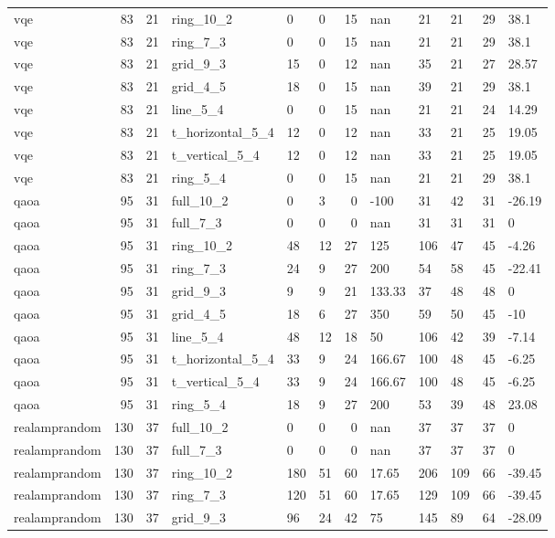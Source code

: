 \begin{longtable}{lrrlllrlllrl}
vqe & 83 & 21 & ring\_10\_2 & 0 & 0 & 15 & nan & 21 & 21 & 29 & 38.1 \\
vqe & 83 & 21 & ring\_7\_3 & 0 & 0 & 15 & nan & 21 & 21 & 29 & 38.1 \\
vqe & 83 & 21 & grid\_9\_3 & 15 & 0 & 12 & nan & 35 & 21 & 27 & 28.57 \\
vqe & 83 & 21 & grid\_4\_5 & 18 & 0 & 15 & nan & 39 & 21 & 29 & 38.1 \\
vqe & 83 & 21 & line\_5\_4 & 0 & 0 & 15 & nan & 21 & 21 & 24 & 14.29 \\
vqe & 83 & 21 & t\_horizontal\_5\_4 & 12 & 0 & 12 & nan & 33 & 21 & 25 & 19.05 \\
vqe & 83 & 21 & t\_vertical\_5\_4 & 12 & 0 & 12 & nan & 33 & 21 & 25 & 19.05 \\
vqe & 83 & 21 & ring\_5\_4 & 0 & 0 & 15 & nan & 21 & 21 & 29 & 38.1 \\
qaoa & 95 & 31 & full\_10\_2 & 0 & 3 & 0 & -100 & 31 & 42 & 31 & -26.19 \\
qaoa & 95 & 31 & full\_7\_3 & 0 & 0 & 0 & nan & 31 & 31 & 31 & 0 \\
qaoa & 95 & 31 & ring\_10\_2 & 48 & 12 & 27 & 125 & 106 & 47 & 45 & -4.26 \\
qaoa & 95 & 31 & ring\_7\_3 & 24 & 9 & 27 & 200 & 54 & 58 & 45 & -22.41 \\
qaoa & 95 & 31 & grid\_9\_3 & 9 & 9 & 21 & 133.33 & 37 & 48 & 48 & 0 \\
qaoa & 95 & 31 & grid\_4\_5 & 18 & 6 & 27 & 350 & 59 & 50 & 45 & -10 \\
qaoa & 95 & 31 & line\_5\_4 & 48 & 12 & 18 & 50 & 106 & 42 & 39 & -7.14 \\
qaoa & 95 & 31 & t\_horizontal\_5\_4 & 33 & 9 & 24 & 166.67 & 100 & 48 & 45 & -6.25 \\
qaoa & 95 & 31 & t\_vertical\_5\_4 & 33 & 9 & 24 & 166.67 & 100 & 48 & 45 & -6.25 \\
qaoa & 95 & 31 & ring\_5\_4 & 18 & 9 & 27 & 200 & 53 & 39 & 48 & 23.08 \\
realamprandom & 130 & 37 & full\_10\_2 & 0 & 0 & 0 & nan & 37 & 37 & 37 & 0 \\
realamprandom & 130 & 37 & full\_7\_3 & 0 & 0 & 0 & nan & 37 & 37 & 37 & 0 \\
realamprandom & 130 & 37 & ring\_10\_2 & 180 & 51 & 60 & 17.65 & 206 & 109 & 66 & -39.45 \\
realamprandom & 130 & 37 & ring\_7\_3 & 120 & 51 & 60 & 17.65 & 129 & 109 & 66 & -39.45 \\
realamprandom & 130 & 37 & grid\_9\_3 & 96 & 24 & 42 & 75 & 145 & 89 & 64 & -28.09 \\

\end{longtable}
